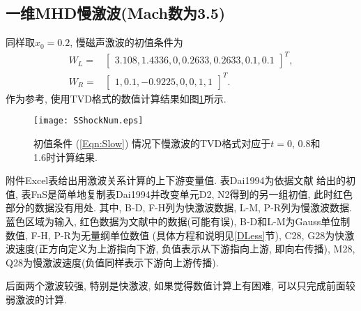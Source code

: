 \documentclass[10.5pt
]{article}
\begin{document}
\subsection{一维MHD慢激波(Mach数为3.5)\citep{Dai1994}}
同样取$x_0 = 0.2$, 慢磁声激波的初值条件为
\begin{align}
W_L =& \left[\begin{array}{ccccccc}
3.108,
1.4336,
0,
0.2633,
0.2633,
0.1,
0.1
\end{array}\right]^T,
\nonumber\\
W_R =& \left[\begin{array}{ccccccc}
1,
0.1,
-0.9225,
0,
0,
1,
1
\end{array}\right]^T.\label{Eqn:Slow}
\end{align}
作为参考, 使用TVD格式\citep{vanLeer1974}的数值计算结果如图\ref{Fig:Slow}所示.
\begin{figure}
\begin{center}
\texttt{[image: SShockNum.eps]}
\caption{初值条件 (\ref{Eqn:Slow}) 情况下慢激波的TVD格式\citep{vanLeer1974}对应于$t=0$, 0.8和1.6时计算结果.}\label{Fig:Slow}
\end{center}
\end{figure}

附件Excel表给出用激波关系计算的上下游变量值. 表Dai1994为依据文献\citet{Dai1994} 给出的初值, 表FnS是简单地复制表Dai1994并改变单元D2, N2得到的另一组初值, 此时红色部分的数据没有用处. 其中, B-D, F-H列为快激波数据, L-M, P-R列为慢激波数据. 蓝色区域为输入, 红色数据为文献\citet{Dai1994}中的数据(可能有误), B-D和L-M为Gauss单位制数值, F-H, P-R为无量纲单位数值 (具体方程和说明见\ref{DLess}节), C28, G28为快激波速度(正方向定义为上游指向下游, 负值表示从下游指向上游, 即向右传播), M28, Q28为慢激波速度(负值同样表示下游向上游传播).

后面两个激波较强, 特别是快激波, 如果觉得数值计算上有困难, 可以只完成前面较弱激波的计算.
\end{document}
